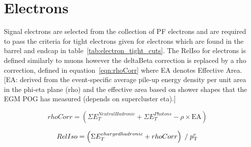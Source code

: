 \section{Electrons \label{sec:electronreco}}
Signal electrons are selected from the collection of PF electrons and are required to pass the criteria for tight electrons given for electrons which are found in the barrel and endcap in table~\ref{tab:electron_tight_cuts}. The RelIso for electrons is defined similarly to muons however the deltaBeta correction is replaced by a rho correction, defined in equation~\ref{eqn:rhoCorr} where EA denotes Effective Area. [EA: derived from the event-specific average pile-up energy density per unit area in the phi-eta plane (rho) and the effective area based on shower shapes that the EGM POG has measured (depends on supercluster eta).]

\begin{centering}
\begin{equation}
rhoCorr = \left( \Sigma E_{T}^{Neutral Hadronic} + \Sigma E_{T}^{Photons} - \rho\times\textrm{EA} \right) 
\label{eqn:rhoCorr}
\end{equation}
\end{centering}


\begin{centering}
\begin{equation}
RelIso = \left( \Sigma E_{T}^{charged hadronic} + rhoCorr \right) \; / \;   p_{\mathrm{T}}^{e}
\label{eqn:dBRelIso}
\end{equation}
\end{centering}

